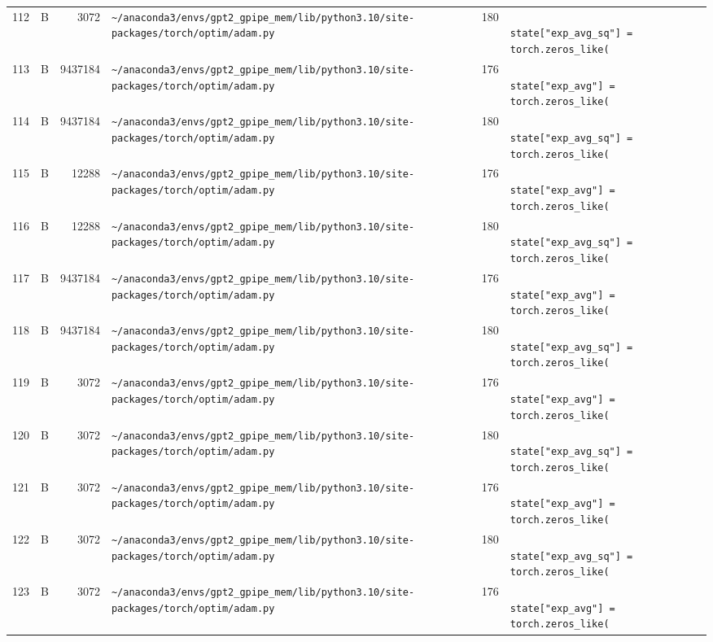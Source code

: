 \documentclass{article}
\begin{document}
\begin{longtable}{r l r p{6.5cm} r p{7.0cm}}
112 & B & 3072 & \lstinline|~/anaconda3/envs/gpt2_gpipe_mem/lib/python3.10/site-packages/torch/optim/adam.py| & 180 & \lstinline|                    state["exp_avg_sq"] = torch.zeros_like(| \\
113 & B & 9437184 & \lstinline|~/anaconda3/envs/gpt2_gpipe_mem/lib/python3.10/site-packages/torch/optim/adam.py| & 176 & \lstinline|                    state["exp_avg"] = torch.zeros_like(| \\
114 & B & 9437184 & \lstinline|~/anaconda3/envs/gpt2_gpipe_mem/lib/python3.10/site-packages/torch/optim/adam.py| & 180 & \lstinline|                    state["exp_avg_sq"] = torch.zeros_like(| \\
115 & B & 12288 & \lstinline|~/anaconda3/envs/gpt2_gpipe_mem/lib/python3.10/site-packages/torch/optim/adam.py| & 176 & \lstinline|                    state["exp_avg"] = torch.zeros_like(| \\
116 & B & 12288 & \lstinline|~/anaconda3/envs/gpt2_gpipe_mem/lib/python3.10/site-packages/torch/optim/adam.py| & 180 & \lstinline|                    state["exp_avg_sq"] = torch.zeros_like(| \\
117 & B & 9437184 & \lstinline|~/anaconda3/envs/gpt2_gpipe_mem/lib/python3.10/site-packages/torch/optim/adam.py| & 176 & \lstinline|                    state["exp_avg"] = torch.zeros_like(| \\
118 & B & 9437184 & \lstinline|~/anaconda3/envs/gpt2_gpipe_mem/lib/python3.10/site-packages/torch/optim/adam.py| & 180 & \lstinline|                    state["exp_avg_sq"] = torch.zeros_like(| \\
119 & B & 3072 & \lstinline|~/anaconda3/envs/gpt2_gpipe_mem/lib/python3.10/site-packages/torch/optim/adam.py| & 176 & \lstinline|                    state["exp_avg"] = torch.zeros_like(| \\
120 & B & 3072 & \lstinline|~/anaconda3/envs/gpt2_gpipe_mem/lib/python3.10/site-packages/torch/optim/adam.py| & 180 & \lstinline|                    state["exp_avg_sq"] = torch.zeros_like(| \\
121 & B & 3072 & \lstinline|~/anaconda3/envs/gpt2_gpipe_mem/lib/python3.10/site-packages/torch/optim/adam.py| & 176 & \lstinline|                    state["exp_avg"] = torch.zeros_like(| \\
122 & B & 3072 & \lstinline|~/anaconda3/envs/gpt2_gpipe_mem/lib/python3.10/site-packages/torch/optim/adam.py| & 180 & \lstinline|                    state["exp_avg_sq"] = torch.zeros_like(| \\
123 & B & 3072 & \lstinline|~/anaconda3/envs/gpt2_gpipe_mem/lib/python3.10/site-packages/torch/optim/adam.py| & 176 & \lstinline|                    state["exp_avg"] = torch.zeros_like(| \\

\end{longtable}
\end{document}
